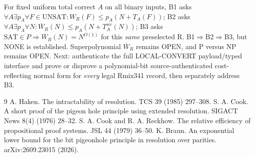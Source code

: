 \documentclass[11pt]{article}
\begin{document}
For fixed uniform total correct $A$ on all binary inputs, B1 asks $\forall A\exists p_A\forall F\in\mathrm{UNSAT}:W_R(F)\le p_A(N+T_A(F))$; B2 asks $\forall A\exists p_A\forall N:\overline W_R(N)\le p_A(N+T_A^{wc}(N))$; B3 asks $\mathrm{SAT}\in P\Rightarrow\overline W_R(N)=N^{O(1)}$ for this \emph{same} preselected R. B1$\Rightarrow$B2$\Rightarrow$B3, but NONE is established. Superpolynomial $\overline W_R$ remains OPEN, and P versus NP remains OPEN. Next: authenticate the full LOCAL-CONVERT payload/typed interface and prove or disprove a polynomial-bit source-authenticated cost-reflecting normal form for \emph{every} legal Rmix341 record, then separately address B3.
\begin{thebibliography}{9}
 A. Haken. The intractability of resolution. TCS 39 (1985) 297--308.
 S. A. Cook. A short proof of the pigeon hole principle using extended resolution. SIGACT News 8(4) (1976) 28--32.
 S. A. Cook and R. A. Reckhow. The relative efficiency of propositional proof systems. JSL 44 (1979) 36--50.
 K. Braun. An exponential lower bound for the bit pigeonhole principle in resolution over parities. arXiv:2609.23015 (2026).
\end{thebibliography}
\end{document}
